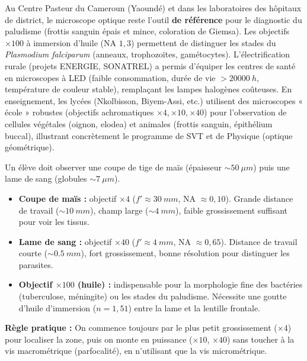 \documentclass[11pt]{article}
\begin{document}
\begin{savaistu}
Au Centre Pasteur du Cameroun (Yaoundé) et dans les laboratoires des hôpitaux de district, le microscope optique reste l'outil \textbf{de référence} pour le diagnostic du paludisme (frottis sanguin épais et mince, coloration de Giemsa). Les objectifs $\times 100$ à immersion d'huile (NA $1,3$) permettent de distinguer les stades du \emph{Plasmodium falciparum} (anneaux, trophozoïtes, gamétocytes). L'électrification rurale (projets ENERGIE, SONATREL) a permis d'équiper les centres de santé en microscopes à LED (faible consommation, durée de vie $> \SI{20000}{h}$, température de couleur stable), remplaçant les lampes halogènes coûteuses. En enseignement, les lycées (Nkolbisson, Biyem-Assi, etc.) utilisent des microscopes « école » robustes (objectifs achromatiques $\times 4, \times 10, \times 40$) pour l'observation de cellules végétales (oignon, elodea) et animales (frottis sanguin, épithélium buccal), illustrant concrètement le programme de SVT et de Physique (optique géométrique).
\end{savaistu}

\begin{exemplebox}
Un élève doit observer une coupe de tige de maïs (épaisseur $\sim \SI{50}{\mu m}$) puis une lame de sang (globules $\sim \SI{7}{\mu m}$).
\begin{itemize}
    \item \textbf{Coupe de maïs :} objectif $\times 4$ ($f' \approx \SI{30}{mm}$, NA $\approx 0,10$). Grande distance de travail ($\sim \SI{10}{mm}$), champ large ($\sim \SI{4}{mm}$), faible grossissement suffisant pour voir les tissus.
    \item \textbf{Lame de sang :} objectif $\times 40$ ($f' \approx \SI{4}{mm}$, NA $\approx 0,65$). Distance de travail courte ($\sim \SI{0,5}{mm}$), fort grossissement, bonne résolution pour distinguer les parasites.
    \item \textbf{Objectif $\times 100$ (huile) :} indispensable pour la morphologie fine des bactéries (tuberculose, méningite) ou les stades du paludisme. Nécessite une goutte d'huile d'immersion ($n=1,51$) entre la lame et la lentille frontale.
\end{itemize}
\textbf{Règle pratique :} On commence toujours par le plus petit grossissement ($\times 4$) pour localiser la zone, puis on monte en puissance ($\times 10$, $\times 40$) sans toucher à la vis macrométrique (parfocalité), en n'utilisant que la vis micrométrique.
\end{exemplebox}
\end{document}
